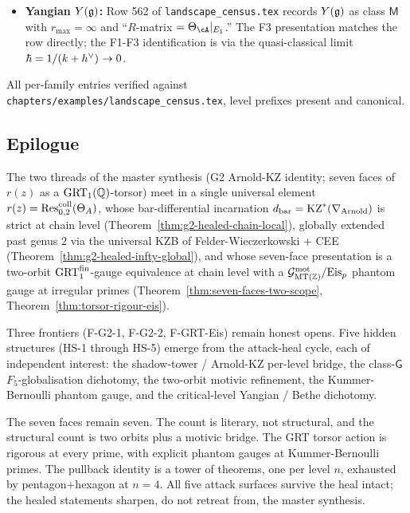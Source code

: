 \begin{itemize}
\item \textbf{Yangian $Y(\mathfrak{g})$:}
   Row 562 of \texttt{landscape\_census.tex} records
   $Y(\mathfrak{g})$ as class $\mathsf{M}$ with $r_{\max} = \infty$ and
   ``$R$-matrix $= \Theta_\cA|_{E_1}$.'' The F3 presentation
   matches the row directly; the F1-F3 identification is via the
   quasi-classical limit $\hbar = 1/(k+h^{\vee}) \to 0$.
\end{itemize}

All per-family entries verified against
\texttt{chapters/examples/landscape\_census.tex}, level prefixes
present and canonical.

\subsection*{Epilogue}

The two threads of the master synthesis (G2 Arnold-KZ identity; seven
faces of $r(z)$ as a $\mathrm{GRT}_1(\mathbb{Q})$-torsor) meet in a single universal
element $r(z) = \operatorname{Res}^{\mathrm{coll}}_{0,2}(\Theta_A)$, whose bar-differential
incarnation $d_{\mathrm{bar}} = \mathrm{KZ}^{*}(\nabla_{\mathrm{Arnold}})$ is strict at chain
level (Theorem~\ref{thm:g2-healed-chain-local}), globally extended
past genus $2$ via the universal KZB of Felder-Wieczerkowski + CEE
(Theorem~\ref{thm:g2-healed-infty-global}), and whose seven-face
presentation is a two-orbit $\mathrm{GRT}_1^{\mathrm{fin}}$-gauge equivalence at chain level
with a $\mathcal{G}^{\mathrm{mot}}_{\mathrm{MT}(\mathbb{Z})}/\mathrm{Eis}_p$ phantom gauge at irregular
primes (Theorem~\ref{thm:seven-faces-two-scope},
Theorem~\ref{thm:torsor-rigour-eis}).

Three frontiers (F-G2-1, F-G2-2, F-GRT-Eis) remain honest opens. Five
hidden structures (HS-1 through HS-5) emerge from the attack-heal
cycle, each of independent interest: the shadow-tower / Arnold-KZ
per-level bridge, the class-$\mathsf{G}$ $F_5$-globalisation dichotomy,
the two-orbit motivic refinement, the Kummer-Bernoulli phantom gauge,
and the critical-level Yangian / Bethe dichotomy.

The seven faces remain seven. The count is literary, not
structural, and the structural count is two orbits plus a motivic
bridge. The GRT torsor action is rigorous at every prime, with explicit
phantom gauges at Kummer-Bernoulli primes. The pullback identity is a
tower of theorems, one per level $n$, exhausted by pentagon+hexagon at
$n = 4$. All five attack surfaces survive the heal intact; the healed
statements sharpen, do not retreat from, the master synthesis.

